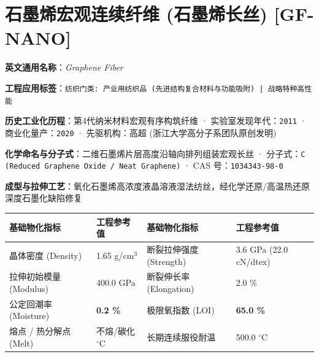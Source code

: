 \documentclass[11pt,openright,twoside,UTF8]{ctexbook}
\begin{document}
\section{石墨烯宏观连续纤维 (石墨烯长丝) [GF-NANO]}
\label{sec:gf-nano}

\noindent\textbf{英文通用名称}：\textit{Graphene Fiber}\par
\noindent\textbf{工程应用标签}：\texttt{纺织门类: 产业用纺织品 (先进结构复合材料与功能吸附) | 战略特种高性能}\par
\noindent\textbf{历史工业化历程}：第4代纳米材料宏观有序构筑纤维 · 实验室发现年代：\texttt{2011} · 商业化量产：\texttt{2020} · 先驱机构：高超 (浙江大学高分子系团队原创发明)\par
\noindent\textbf{化学命名与分子式}：二维石墨烯片层高度沿轴向排列组装宏观长丝 · 分子式：\texttt{C (Reduced Graphene Oxide / Neat Graphene)} · CAS 号：\texttt{1034343-98-0}\par
\noindent\textbf{成型与拉伸工艺}：氧化石墨烯高浓度液晶溶液湿法纺丝，经化学还原/高温热还原深度石墨化缺陷修复\par

\vspace{0.15cm}
\begin{center}
\small
\begin{tabularx}{\textwidth}{p{3.8cm}Xp{3.8cm}X}
\toprule
\textbf{基础物化指标} & \textbf{工程参考值} & \textbf{基础物化指标} & \textbf{工程参考值} \\
\midrule
晶体密度 (Density) & 1.65 g/cm$^3$ & 断裂拉伸强度 (Strength) & 3.6 GPa (22.0 cN/dtex) \\
拉伸初始模量 (Modulus) & 400.0 GPa & 断裂伸长率 (Elongation) & 2.0 \% \\
公定回潮率 (Moisture) & \textbf{0.2 \%} & 极限氧指数 (LOI) & \textbf{65.0 \%} \\
熔点 / 热分解点 (Melt) & 不熔/碳化 $^\circ\mathrm{C}$ & 长期连续服役耐温 & 500.0 $^\circ\mathrm{C}$ \\
\bottomrule
\end{tabularx}
\end{center}
\vspace{0.15cm}
\end{document}
